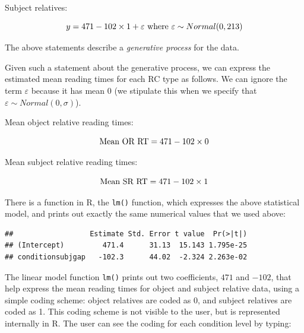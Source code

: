 \documentclass[12pt,]{krantz}
\newenvironment{Shaded}{\begin{snugshade}}{\end{snugshade}}
\newcommand{\KeywordTok}[1]{\textcolor[rgb]{0.13,0.29,0.53}{\textbf{#1}}}
\newcommand{\NormalTok}[1]{#1}
\newcommand{\OperatorTok}[1]{\textcolor[rgb]{0.81,0.36,0.00}{\textbf{#1}}}
\newcommand{\StringTok}[1]{\textcolor[rgb]{0.31,0.60,0.02}{#1}}
\begin{document}
Subject relatives:

\begin{equation}
y = 471 - 102\times 1 + \varepsilon \hbox{ where } \varepsilon \sim Normal(0,213)
\end{equation}

The above statements describe a \emph{generative process} for the data.

Given such a statement about the generative process, we can express the estimated mean reading times for each RC type as follows. We can ignore the term \(\varepsilon\) because it has mean 0 (we stipulate this when we specify that \(\varepsilon \sim Normal(0,\sigma)\)).

Mean object relative reading times:

\begin{equation}
\hbox{Mean OR RT}= 471 -102\times 0
\end{equation}

Mean subject relative reading times:

\begin{equation}
\hbox{Mean SR RT} = 471 - 102\times 1 
\end{equation}

There is a function in R, the \texttt{lm()} function, which expresses the above statistical model, and prints out exactly the same numerical values that we used above:

\begin{Shaded}
\end{Shaded}

\begin{verbatim}
##                  Estimate Std. Error t value  Pr(>|t|)
## (Intercept)         471.4      31.13  15.143 1.795e-25
## conditionsubjgap   -102.3      44.02  -2.324 2.263e-02
\end{verbatim}

The linear model function \texttt{lm()} prints out two coefficients, \(471\) and \(-102\), that help express the mean reading times for object and subject relative data, using a simple coding scheme: object relatives are coded as 0, and subject relatives are coded as 1. This coding scheme is not visible to the user, but is represented internally in R. The user can see the coding for each condition level by typing:
\end{document}

